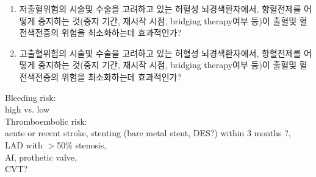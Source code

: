 \documentclass{paper}
\begin{document}
\begin{enumerate}
	\item 저출혈위험의 시술및 수술을 고려하고 있는 허혈성 뇌경색환자에서, 항혈전제를 어떻게 중지하는 것(중지 기간, 재시작 시점, bridging therapy여부 등)이 출혈및 혈전색전증의 위험을 최소화하는데 효과적인가?
	\item 고출혈위험의 시술및 수술을 고려하고 있는 허혈성 뇌경색환자에서, 항혈전제를 어떻게 중지하는 것(중지 기간, 재시작 시점, bridging therapy여부 등)이 출혈및 혈전색전증의 위험을 최소화하는데 효과적인가?
\end{enumerate}
 
 \color{red}
 Bleeding risk: \\
 high vs. low\\
 
 Thromboembolic risk: \\
 acute or recent stroke, stenting (bare metal stent, DES?) within 3 months ?, \\
 LAD with $>$50\% stenosis, \\
 Af, prothetic valve, \\
 CVT?
\end{document}
